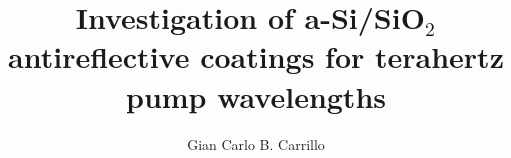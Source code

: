 \documentclass[12pt]{gatechthesis}
\title{Investigation of a-Si/SiO$_2$ antireflective coatings for terahertz pump wavelengths}
\author{Gian Carlo B. Carrillo}
\begin{document}
% 
%

\begin{frontmatter}
    \makeTOC{}
    \makeListOfTables{}
    \makeListOfFigures{}
    
\end{frontmatter}

\begin{thesisbody}
    
    
    
    
    
    \makeBibliography{}
    
\end{thesisbody}
\end{document}
